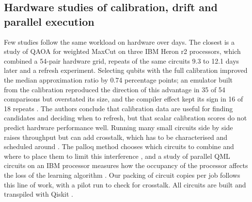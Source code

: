 \subsection{Hardware studies of calibration, drift and parallel execution}
Few studies follow the same workload on hardware over days. The closest is a study of QAOA for
weighted MaxCut on three IBM Heron r2 processors, which combined a 54-pair hardware grid,
repeats of the same circuits 9.3 to 12.1 days later and a refresh experiment. Selecting qubits
with the full calibration improved the median approximation ratio by 0.74 percentage points; an
emulator built from the calibration reproduced the direction of this advantage in 35 of 54
comparisons but overstated its size, and the compiler effect kept its sign in 16 of 18 repeats
\cite{qaoa2026drift}. The authors conclude that calibration data are useful for finding
candidates and deciding when to refresh, but that scalar calibration scores do not predict
hardware performance well. Running many small circuits side by side raises throughput but can
add crosstalk, which has to be characterised and scheduled around \cite{murali2020crosstalk}.
The palloq method chooses which circuits to combine and where to place them to limit this
interference \cite{ohkura2022simultaneous}, and a study of parallel QML circuits on an IBM
processor measures how the occupancy of the processor affects the loss of the learning
algorithm \cite{parallelqml2024}. Our packing of  circuit copies per job follows
this line of work, with a pilot run to check for crosstalk. All circuits are built and
transpiled with Qiskit \cite{javadiabhari2024qiskit}.

